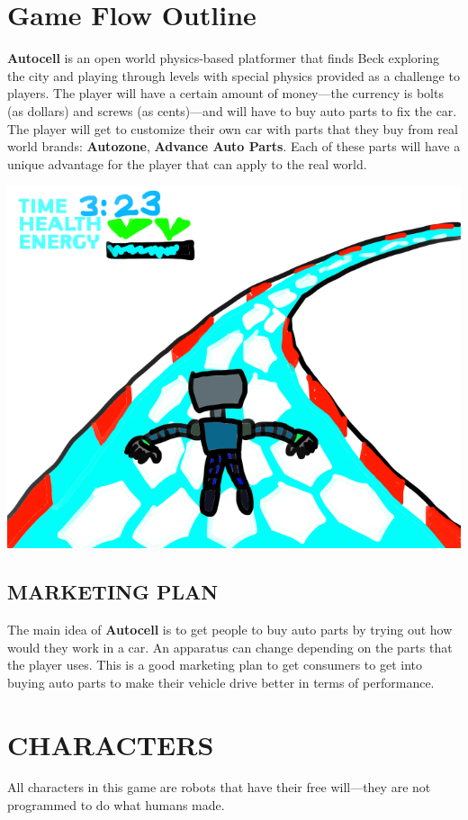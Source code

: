 \documentclass[12pt]{article}
\begin{document}
\begin{CJK}{UTF8}{min}
	\section*{Game Flow Outline}
	\textbf{Autocell} is an open world physics-based platformer that finds Beck exploring the city and playing through levels with special physics provided as a challenge to players. The player will have a certain amount of money---the currency is bolts (as dollars) and screws (as cents)---and will have to buy auto parts to fix the car. The player will get to customize their own car with parts that they buy from real world brands: \textbf{Autozone}, \textbf{Advance Auto Parts}. Each of these parts will have a unique advantage for the player that can apply to the real world. \newline
	\begin{center}
		\includegraphics[width=6in]{Gameplay}
	\end{center}
	\subsection*{MARKETING PLAN}
	The main idea of \textbf{Autocell} is to get people to buy auto parts by trying out how would they work in a car. An apparatus can change depending on the parts that the player uses. This is a good marketing plan to get consumers to get into buying auto parts to make their vehicle drive better in terms of performance.
	\newpage
	\section*{CHARACTERS}
	All characters in this game are robots that have their free will---they are not programmed to do what humans made.

\end{CJK}
\end{document}
